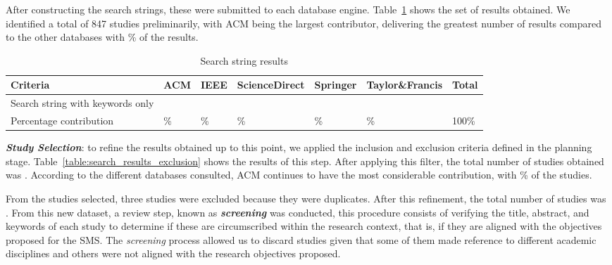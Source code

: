 After constructing the search strings, these were submitted to each database engine. Table~\ref{table:search_results} shows the set of results obtained. We identified a total of 847 studies preliminarily, with ACM being the largest contributor, delivering the greatest number of results compared to the other databases with \acmp\% of the results.

\begin{table}[ht]
    \renewcommand{\arraystretch}{1.3}
    \centering
	\caption{Search string results}
	\begin{tabular}{p{4.4cm}p{0.9cm}p{0.9cm}p{2.4cm}p{1.4cm}p{2.5cm}p{0.9cm}}
        \hline
        \textbf{Criteria}                         & \textbf{ACM} & \textbf{IEEE} & \textbf{ScienceDirect} & \textbf{Springer} & \textbf{Taylor\&Francis} & \textbf{Total} \\
        \hline
        Search string with keywords only & \acm{}       & \ieee{}       & \sd{}                  & \spr{}            & \tf{}                    & \tot{}         \\
        Percentage contribution          & \acmp{}\%    & \ieeep{}\%    & \sdp{}\%               & \sprp{}\%         & \tfp{}\%                 & 100\%          \\
        \hline
    \end{tabular}
	\label{table:search_results}
\end{table}

\textit{\textbf{Study Selection}}: to refine the results obtained up to this point, we applied the inclusion and exclusion criteria defined in the planning stage. Table~\ref{table:search_results_exclusion} shows the results of this step. After applying this filter, the total number of studies obtained was \itot. According to the different databases consulted, ACM continues to have the most considerable contribution, with \iacmp\% of the studies.

From the \itot{} studies selected, three studies were excluded because they were duplicates. After this refinement, the total number of studies was \depTot{}. From this new dataset, a review step, known as \textit{\textbf{screening}} was conducted, this procedure consists of verifying the title, abstract, and keywords of each study to determine if these are circumscribed within the research context, that is, if they are aligned with the objectives proposed for the SMS. The \textit{screening} process allowed us to discard \screen{} studies given that some of them made reference to different academic disciplines and others were not aligned with the research objectives proposed.

